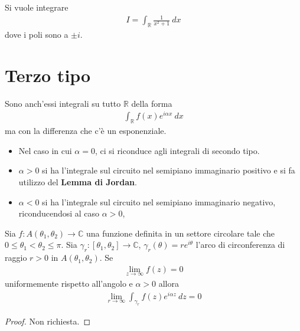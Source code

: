 \documentclass[a4paper, oneside]{article}
\begin{document}
\begin{example}
    Si vuole integrare
    \begin{gather*}
        I = \int_{\mathbb{R}} \frac{1}{x^{2} + 1} \ dx 
    \end{gather*}
    dove i poli sono a $\pm i$. 
\end{example}

\section{Terzo tipo}
Sono anch'essi integrali su tutto $\mathbb{R}$ della forma
\begin{align}
    \int_{\mathbb{R}} f(x) e^{i\alpha x} \ dx 
\end{align}
ma con la differenza che c'è un esponenziale.
\begin{itemize}
    \item Nel caso in cui $\alpha = 0$, 
ci si riconduce agli integrali di secondo tipo. 
    \item $\alpha > 0$ si ha l'integrale sul circuito 
    nel semipiano immaginario positivo e si fa utilizzo del \textbf{Lemma di Jordan}.
    \item $\alpha < 0$ si ha l'integrale sul circuito nel 
    semipiano immaginario negativo, riconducendosi al caso $\alpha > 0$,
\end{itemize}

\begin{lemma}
    Sia $f: A(\theta_1, \theta_2) \to \mathbb{C}$ una funzione definita in un settore circolare
    tale che $0 \leq \theta_1 < \theta_2 \leq \pi$. Sia $\gamma_r :[\theta_1, \theta_2] \to \mathbb{C}$, 
    $\gamma_r(\theta) = re^{i\theta}$ l'arco di circonferenza di 
    raggio $r > 0 $ in $A(\theta_1, \theta_2)$. Se 
    \begin{gather*}
        \lim_{z \to \infty } f(z) = 0 
    \end{gather*}
    uniformemente rispetto all'angolo e $\alpha > 0$ allora 
    \begin{align}
        \lim_{r \to \infty } \int_{\gamma_r} f(z) e^{i\alpha z} \ dz = 0  
    \end{align}
\end{lemma}
\begin{proof}
    Non richiesta.
\end{proof}
\end{document}
